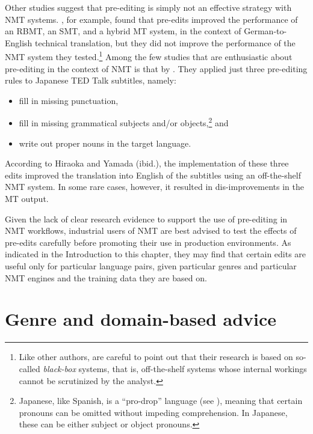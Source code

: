 \documentclass[output=paper,colorlinks,citecolor=brown,
]{langscibook}
\begin{document}
Other studies suggest that pre-editing is simply not an effective strategy with NMT systems. \citet{MarzoukHansen-Schirra2019}, for example, found that pre-edits improved the performance of an RBMT, an SMT, and a hybrid MT system, in the context of German-to-English technical translation, but they did not improve the performance of the NMT system they tested.\footnote{Like other authors, \citet{MarzoukHansen-Schirra2019} are careful to point out that their research is based on so-called \textit{black-box} systems, that is, off-the-shelf systems whose internal workings cannot be scrutinized by the analyst.}  Among the few studies that are enthusiastic about pre-editing in the context of NMT is that by \citet{hiraoka-yamada-2019}. They applied just three pre-editing rules to Japanese TED Talk subtitles, namely:

\begin{itemize}
\item fill in missing punctuation,
\item fill in missing grammatical subjects and/or objects,\footnote{Japanese, like Spanish, is a “pro-drop” language (see ), meaning that certain pronouns can be omitted without impeding comprehension. In Japanese, these can be either subject or object pronouns.} and
\item write out proper nouns in the target language.
\end{itemize}

According to Hiraoka and Yamada (ibid.), the implementation of these three edits improved the translation into English of the subtitles using an off-the-shelf NMT system. In some rare cases, however, it resulted in dis-improvements in the MT output. 

Given the lack of clear research evidence to support the use of pre-editing in NMT workflows, industrial users of NMT are best advised to test the effects of pre-edits carefully before promoting their use in production environments. As indicated in the Introduction to this chapter, they may find that certain edits are useful only for particular language pairs, given particular genres and particular NMT engines and the training data they are based on.

\section{Genre and domain-based advice}
\end{document}
